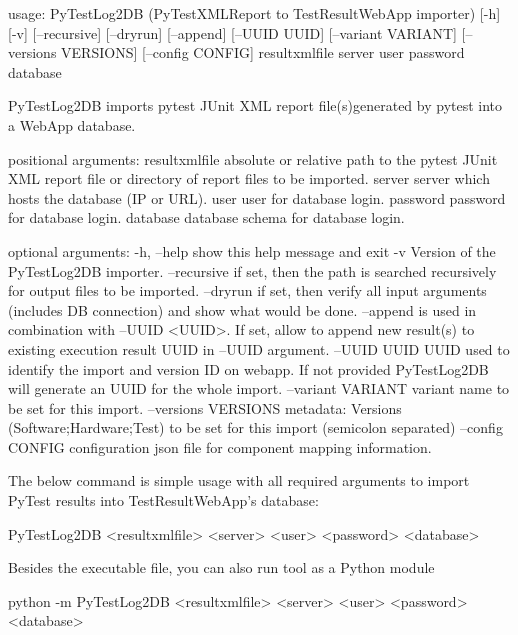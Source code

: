 \begin{robotlog}
usage: PyTestLog2DB (PyTestXMLReport to TestResultWebApp importer) [-h] [-v]
                    [--recursive] [--dryrun] [--append] [--UUID UUID]
                    [--variant VARIANT] [--versions VERSIONS] [--config CONFIG]
                    resultxmlfile server user password database

PyTestLog2DB imports pytest JUnit XML report file(s)generated by pytest into a WebApp database.

positional arguments:
resultxmlfile        absolute or relative path to the pytest JUnit XML report
                     file or directory of report files to be imported.
server               server which hosts the database (IP or URL).
user                 user for database login.
password             password for database login.
database             database schema for database login.

optional arguments:
-h, --help           show this help message and exit
-v                   Version of the PyTestLog2DB importer.
--recursive          if set, then the path is searched recursively for output
                     files to be imported.
--dryrun             if set, then verify all input arguments (includes DB connection)
                     and show what would be done.
--append             is used in combination with --UUID <UUID>. If set, allow to append
                     new result(s) to existing execution result UUID in --UUID argument.
--UUID UUID          UUID used to identify the import and version ID on webapp.
                     If not provided PyTestLog2DB will generate an UUID for the whole import.
--variant VARIANT    variant name to be set for this import.
--versions VERSIONS  metadata: Versions (Software;Hardware;Test) to be set for this import 
                     (semicolon separated)
--config CONFIG      configuration json file for component mapping information.
\end{robotlog}

The below command is simple usage with all required arguments to import
PyTest results into TestResultWebApp's database:

\begin{robotlog}
PyTestLog2DB <resultxmlfile> <server> <user> <password> <database>
\end{robotlog}

Besides the executable file, you can also run tool as a Python module

\begin{robotlog}
python -m PyTestLog2DB <resultxmlfile> <server> <user> <password> <database>
\end{robotlog}

